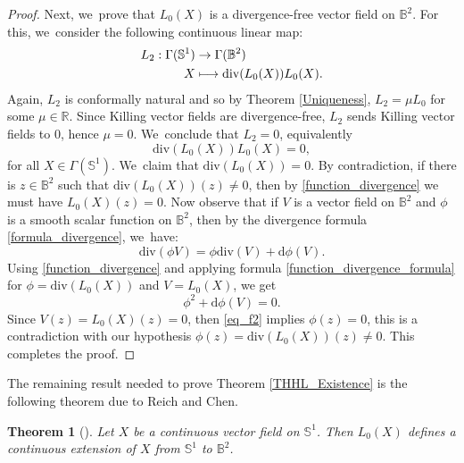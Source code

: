 \documentclass[11pt]{article}
\newcommand\mto{\mathchoice{\longmapsto}{\mapsto}{\mapsto}{\mapsto}}
\theoremstyle{plain}
\newtheorem{theorem}[cor]{Theorem}
\theoremstyle{definition}
\begin{document}
\begin{proof}
Next, we~prove that $L_0(X)$ is a divergence-free vector field on $\mathbb{B}^2$. For this, we~consider the following continuous linear map:
\[
\begin{aligned}
L_2:\Gamma(\mathbb{S}^1) & \to \Gamma(\mathbb{B}^2) \\
X & \mto \mathrm{div}(L_0(X))L_0(X).
\end{aligned}
\]
Again, $L_2$ is conformally natural and so by Theorem \ref{Uniqueness}, $L_2=\mu L_0$ for some $\mu\in\mathbb{R}$. Since Killing vector fields are divergence-free, $L_2$ sends Killing vector fields to $0$, hence $\mu=0$. We~conclude that $L_2=0$, equivalently \begin{equation}\label{function_divergence}
\mathrm{div}(L_0(X))L_0(X)=0,
\end{equation} for all $X\in\Gamma(\mathbb{S}^1)$. We~claim that $\mathrm{div}(L_0(X))=0$. By contradiction, if there is $z\in\mathbb{B}^2$ such that $\mathrm{div}(L_0(X))(z)\neq0$, then by \eqref{function_divergence} we must have $L_0(X)(z)=0$. Now observe that if $V$ is a vector field on $\mathbb{B}^2$ and $\phi$ is a smooth scalar function on $\mathbb{B}^2$, then by the divergence formula \eqref{formula_divergence}, we~have:
\begin{equation}\label{function_divergence_formula}
\mathrm{div}(\phi V)=\phi\mathrm{div}(V)+\mathrm{d}\phi(V).
\end{equation}
Using \eqref{function_divergence} and applying formula \eqref{function_divergence_formula} for $\phi=\mathrm{div}(L_0(X))$ and $V=L_0(X)$, we get
\begin{equation}\label{eq_f2}
\phi^2+\mathrm{d}\phi(V)=0.
\end{equation} Since $V(z)=L_0(X)(z)=0$, then \eqref{eq_f2} implies $\phi(z)=0$, this is a contradiction with our hypothesis $\phi(z)=\mathrm{div}(L_0(X))(z)\neq 0$. This completes the proof.
\end{proof}
The remaining result needed to prove Theorem \ref{THHL_Existence} is the following theorem due to Reich and Chen.
\begin{theorem}[\cite{Extension_with_bounded_derivative}]\label{extension_Reich}
Let $X$ be a continuous vector field on $\mathbb{S}^1$. Then $L_0(X)$ defines a continuous extension of $X$ from $\mathbb{S}^1$ to $\mathbb{B}^2$.
\end{theorem}
\end{document}
